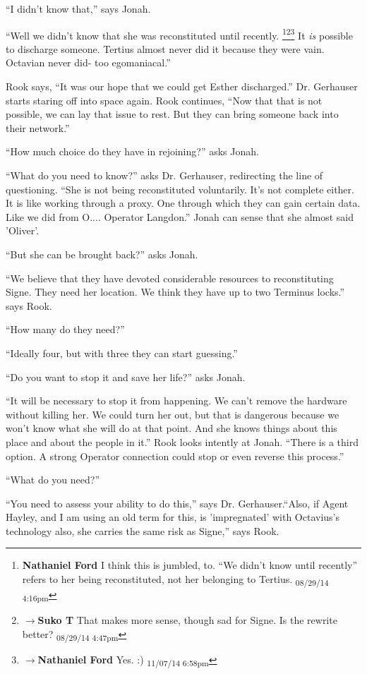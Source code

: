 ``I didn't know that,'' says Jonah.

``Well we didn't know that she was reconstituted until recently. \footnote{\textbf{Nathaniel Ford }I think this is jumbled, to. ``We didn't know until recently'' refers to her being reconstituted, not her belonging to Tertius. \textsubscript{08/29/14 4:16pm}}\footnote{$\rightarrow$\textbf{Suko T }That makes more sense, though sad for Signe.  Is the rewrite better? \textsubscript{08/29/14 4:47pm}}\footnote{$\rightarrow$\textbf{Nathaniel Ford }Yes. :) \textsubscript{11/07/14 6:58pm}} It \textit{is} possible to discharge someone.  Tertius almost never did it because they were vain.  Octavian never did- too egomaniacal.''

Rook says, ``It was our hope that we could get Esther discharged.''  Dr. Gerhauser starts staring off into space again.  Rook continues, ``Now that that is not possible, we can lay that issue to rest.  But they can bring someone back into their network.''

``How much choice do they have in rejoining?'' asks Jonah.

``What do you need to know?'' asks Dr. Gerhauser, redirecting the line of questioning.  ``She is not being reconstituted voluntarily.  It's not complete either.  It is like working through a proxy.  One through which they can gain certain data.  Like we did from O.... Operator Langdon.''  Jonah can sense that she almost said 'Oliver'.

``But she can be brought back?'' asks Jonah.

``We believe that they have devoted considerable resources to reconstituting Signe.  They need her location.  We think they have up to two Terminus locks.'' says Rook.

``How many do they need?''

``Ideally four, but with three they can start guessing.''

``Do you want to stop it and save her life?'' asks Jonah.

``It will be necessary to stop it from happening.  We can't remove the hardware without killing her.  We could turn her out, but that is dangerous because we won't know what she will do at that point.  And she knows things about this place and about the people in it.''  Rook looks intently at Jonah.  ``There is a third option.  A strong Operator connection could stop or even reverse this process.''

``What do you need?''

``You need to assess your ability to do this,'' says Dr. Gerhauser.``Also, if Agent Hayley, and I am using an old term for this, is 'impregnated' with Octavius's technology also, she carries the same risk as Signe,'' says Rook.

